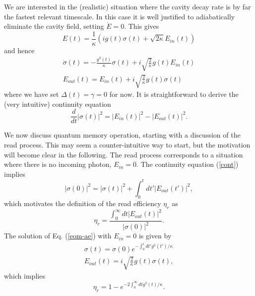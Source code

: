 \documentclass[aps,prl,twocolumn]{revtex4}
\begin{document}

We are interested in the (realistic) situation where the cavity decay rate is by far the fastest relevant timescale. In this case it is well justified to adiabatically eliminate the cavity field, setting $\dot{E}=0$. This gives
\begin{equation}
E(t)=\frac{1}{\kappa}(i g(t) \sigma(t) + \sqrt{2 \kappa} E_{in}(t))
\end{equation}
and hence
\begin{eqnarray}
\dot{\sigma}(t)=-\frac{g^2(t)}{\kappa} \sigma(t)+i \sqrt{\frac{2}{\kappa}} g(t) E_{in}(t) \nonumber\\
E_{out}(t)=E_{in}(t)+i \sqrt{\frac{2}{\kappa}} g(t) \sigma(t)
\label{eom-ae}
\end{eqnarray}
where we have set $\Delta(t)=\gamma=0$ for now. It is straightforward to derive the (very intuitive) continuity equation
\begin{equation}
\frac{d}{dt} |\sigma(t)|^2=|E_{in}(t)|^2-|E_{out}(t)|^2. \label{cont}
\end{equation}

We now discuss quantum memory operation, starting with a discussion of the read process. This may seem a counter-intuitive way to start, but the motivation will become clear in the following. The read process corresponds to a situation where there is no incoming photon, $E_{in}=0$. The continuity equation (\ref{cont}) implies
\begin{equation}
|\sigma(0)|^2=|\sigma(t)|^2+\int_0^t dt' |E_{out}(t')|^2,
\end{equation}
which motivates the definition of the read efficiency $\eta_r$ as
\begin{equation}
\eta_r=\frac{\int_0^{\infty} dt |E_{out}(t)|^2}{|\sigma(0)|^2}.
\end{equation}
The solution of Eq. (\ref{eom-ae}) with $E_{in}=0$ is given by
\begin{eqnarray}
\sigma(t)=\sigma(0) e^{-\int_0^t dt' g^2(t')/\kappa} \nonumber\\
E_{out}(t)=i \sqrt{\frac{2}{\kappa}} g(t) \sigma(t),
\label{sigmaread}
\end{eqnarray}
which implies
\begin{equation}
\eta_r=1-e^{-2 \int_0^{\infty} dt g^2(t)/\kappa}. \label{etar}
\end{equation}
\end{document}
